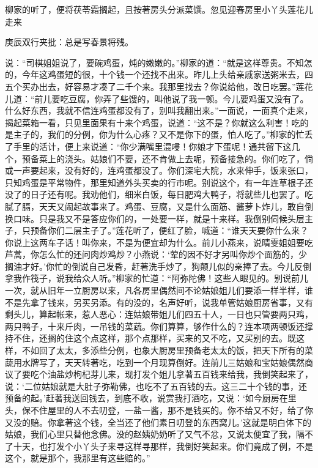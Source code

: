 \begin{parag}
    柳家的听了，便将茯苓霜搁起，且按著房头分派菜馔。忽见迎春房里小丫头莲花儿走来\begin{note}庚辰双行夹批：总是写春景将残。\end{note}说：“司棋姐姐说了，要碗鸡蛋，炖的嫩嫩的。”柳家的道：“就是这样尊贵。不知怎的，今年这鸡蛋短的很，十个钱一个还找不出来。昨儿上头给亲戚家送粥米去，四五个买办出去，好容易才凑了二千个来。我那里找去？你说给他，改日吃罢。”莲花儿道：“前儿要吃豆腐，你弄了些馊的，叫他说了我一顿。今儿要鸡蛋又没有了。什么好东西，我就不信连鸡蛋都没有了，别叫我翻出来。”一面说，一面真个走来，揭起菜箱一看，只见里面果有十来个鸡蛋，说道：“这不是？你就这么利害！吃的是主子的，我们的分例，你为什么心疼？又不是你下的蛋，怕人吃了。”柳家的忙丢了手里的活计，便上来说道：“你少满嘴里混唚！你娘才下蛋呢！通共留下这几个，预备菜上的浇头。姑娘们不要，还不肯做上去呢，预备接急的。你们吃了，倘或一声要起来，没有好的，连鸡蛋都没了。你们深宅大院，水来伸手，饭来张口，只知鸡蛋是平常物件，那里知道外头买卖的行市呢。别说这个，有一年连草根子还没了的日子还有呢。我劝他们，细米白饭，每日肥鸡大鸭子，将就些儿也罢了。吃腻了膈，天天又闹起故事来了。鸡蛋、豆腐，又是什么面筋、酱萝卜炸儿，敢自倒换口味。只是我又不是答应你们的，一处要一样，就是十来样。我倒别伺候头层主子，只预备你们二层主子了。”莲花听了，便红了脸，喊道：“谁天天要你什么来？你说上这两车子话！叫你来，不是为便宜却为什么。前儿小燕来，说晴雯姐姐要吃芦蒿，你怎么忙的还问肉炒鸡炒？小燕说：‘荤的因不好才另叫你炒个面筋的，少搁油才好。’你忙的倒说自己发昏，赶著洗手炒了，狗颠儿似的亲捧了去。今儿反倒拿我作筏子，说我给众人听。”柳家的忙道：“阿弥陀佛！这些人眼见的。别说前儿一次，就从旧年一立厨房以来，凡各房里偶然间不论姑娘姐儿们要添一样半样，谁不是先拿了钱来，另买另添。有的没的，名声好听，说我单管姑娘厨房省事，又有剩头儿，算起帐来，惹人恶心：连姑娘带姐儿们四五十人，一日也只管要两只鸡，两只鸭子，十来斤肉，一吊钱的菜蔬。你们算算，够作什么的？连本项两顿饭还撑持不住，还搁的住这个点这样，那个点那样，买来的又不吃，又买别的去。既这样，不如回了太太，多添些分例，也象大厨房里预备老太太的饭，把天下所有的菜蔬用水牌写了，天天转著吃，吃到一个月现算倒好。连前儿三姑娘和宝姑娘偶然商议了要吃个油盐炒枸杞芽儿来，现打发个姐儿拿著五百钱来给我，我倒笑起来了，说：‘二位姑娘就是大肚子弥勒佛，也吃不了五百钱的去。这三二十个钱的事，还预备的起。’赶著我送回钱去，到底不收，说赏我打酒吃，又说：‘如今厨房在里头，保不住屋里的人不去叨登，一盐一酱，那不是钱买的。你不给又不好，给了你又没的赔。你拿著这个钱，全当还了他们素日叨登的东西窝儿。’这就是明白体下的姑娘，我们心里只替他念佛。没的赵姨奶奶听了又气不忿，又说太便宜了我，隔不了十天，也打发个小丫头子来寻这样寻那样，我倒好笑起来。你们竟成了例，不是这个，就是那个，我那里有这些赔的。”
\end{parag}


